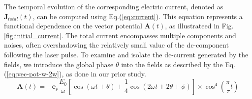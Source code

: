 The temporal evolution of the corresponding electric current, denoted as $\mathbf{J}_{total}(t)$, can be computed using Eq.(\ref{eq:current}). This equation represents a functional dependence on the vector potential $\mathbf{A}(t)$, as illustrateed in Fig.\ref{fig:initial_current}. The total current encompasses multiple components and noises, often overshadowing the relatively small value of the dc-component following the laser pulse. To examine and isolate the dc-current generated by the fields, we introduce the global phase $\theta$ into the fields as described by the Eq.(\ref{eq:vec-pot-w-2w}), as done in our prior study\cite{sato2023limitations}.
\begin{equation}
\mathbf{A}(t) = -\mathbf{e}_p \frac{E_0}{\omega} \left [
\cos \left (\omega t + \theta \right ) + \frac{1}{4}\cos
\left (2\omega t + 2\theta + \phi \right )
\right ] \times \cos^4 \left (\frac{\pi}{\tau}t \right )
\label{eq:vec-pot-w-2w}
\end{equation}


